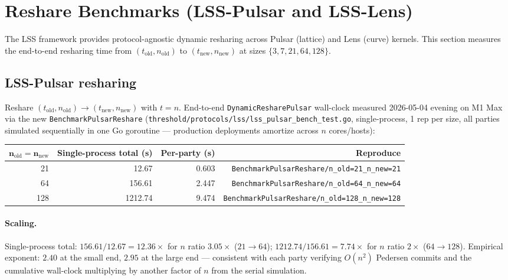 \section{Reshare Benchmarks (LSS-Pulsar and LSS-Lens)}
\label{sec:reshare-benchmarks}

The LSS framework \cite{luxlssmpc,lp077} provides protocol-agnostic dynamic resharing across Pulsar (lattice) and Lens (curve) kernels. This section measures the end-to-end resharing time from $(t_{\mathrm{old}}, n_{\mathrm{old}})$ to $(t_{\mathrm{new}}, n_{\mathrm{new}})$ at sizes $\{3, 7, 21, 64, 128\}$.

\subsection{LSS-Pulsar resharing}

Reshare $(t_{\mathrm{old}}, n_{\mathrm{old}}) \to (t_{\mathrm{new}}, n_{\mathrm{new}})$ with $t = n$. End-to-end \texttt{DynamicResharePulsar} wall-clock measured 2026-05-04 evening on M1 Max via the new \texttt{BenchmarkPulsarReshare} (\texttt{threshold/protocols/lss/lss\_pulsar\_bench\_test.go}, single-process, 1 rep per size, all parties simulated sequentially in one Go goroutine — production deployments amortize across $n$ cores/hosts):

\begin{center}
\begin{tabular}{@{}rrrr@{}}
  \toprule
  $\mathbf{n_{\mathrm{old}} = n_{\mathrm{new}}}$ & \textbf{Single-process total (s)} & \textbf{Per-party (s)} & \textbf{Reproduce} \\
  \midrule
  21  & 12.67    & 0.603  & \texttt{BenchmarkPulsarReshare/n\_old=21\_n\_new=21} \\
  64  & 156.61   & 2.447  & \texttt{BenchmarkPulsarReshare/n\_old=64\_n\_new=64} \\
  128 & 1212.74  & 9.474  & \texttt{BenchmarkPulsarReshare/n\_old=128\_n\_new=128} \\
  \bottomrule
\end{tabular}
\end{center}

\paragraph{Scaling.}
Single-process total: $156.61 / 12.67 = 12.36\times$ for $n$ ratio
$3.05\times$ ($21 \to 64$); $1212.74 / 156.61 = 7.74\times$ for $n$
ratio $2\times$ ($64 \to 128$). Empirical exponent: $2.40$ at the
small end, $2.95$ at the large end --- consistent with each party
verifying $O(n^2)$ Pedersen commits and the cumulative wall-clock
multiplying by another factor of $n$ from the serial simulation.


